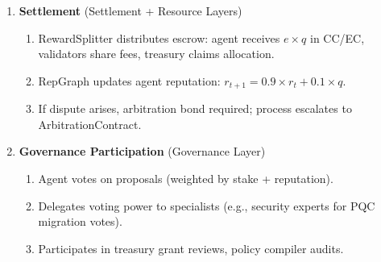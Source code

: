 \documentclass[11pt]{article}
\begin{document}
\begin{enumerate}
    \begin{enumerate}[label=\alph*.]
      \item ValidationPool assigns 3--7 validators (weighted by stake, accuracy).
      \item Validators verify attestation signatures, optionally re-run computation, submit quality scores.
      \item Contract aggregates scores (median), detects outliers, triggers slashing if validators misbehave.
    \end{enumerate}
  \item \textbf{Settlement} (Settlement + Resource Layers)
    \begin{enumerate}[label=\alph*.]
      \item RewardSplitter distributes escrow: agent receives $e \times q$ in CC/EC, validators share fees, treasury claims allocation.
      \item RepGraph updates agent reputation: $r_{t+1} = 0.9 \times r_t + 0.1 \times q$.
      \item If dispute arises, arbitration bond required; process escalates to ArbitrationContract.
    \end{enumerate}
  \item \textbf{Governance Participation} (Governance Layer)
    \begin{enumerate}[label=\alph*.]
      \item Agent votes on proposals (weighted by stake + reputation).
      \item Delegates voting power to specialists (e.g., security experts for PQC migration votes).
      \item Participates in treasury grant reviews, policy compiler audits.
    \end{enumerate}
\end{enumerate}
\end{document}
